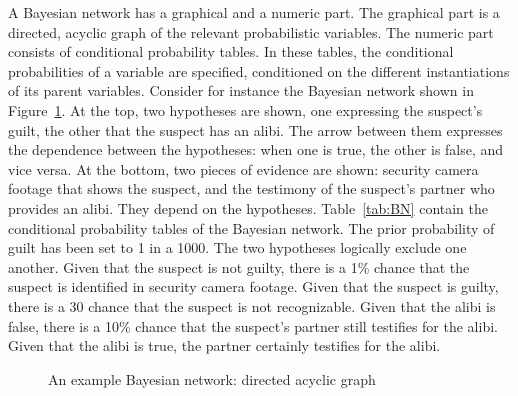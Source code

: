 \documentclass[10pt]{article}
\begin{document}
A Bayesian network has a graphical and a numeric part. The graphical part is a directed, acyclic graph of the relevant probabilistic variables. The numeric part consists of conditional probability tables. In these tables, the conditional probabilities of a variable are specified, conditioned on the different instantiations of its parent variables. Consider for instance the Bayesian network shown in Figure~\ref{fig:BN}. At the top, two hypotheses are shown, one expressing the suspect's guilt, the other that the suspect has an alibi. The arrow between them expresses the dependence between the hypotheses: when one is true, the other is false, and vice versa. At the bottom, two pieces of evidence are shown: security camera footage that shows the suspect, and the testimony of the suspect's partner who provides an alibi. They depend on the hypotheses. Table~\ref{tab:BN} contain the conditional probability tables of the Bayesian network. The prior probability of guilt has been set to 1 in a 1000. The two hypotheses logically exclude one another. Given that the suspect is not guilty, there is a 1\% chance that the suspect is identified in security camera footage. Given that the suspect is guilty, there is a 30\5 chance that the suspect is not recognizable. Given that the alibi is false, there is a 10\% chance that the suspect's partner still testifies for the alibi. Given that the alibi is true, the partner certainly testifies for the alibi.

\begin{figure}[t]
\centering

\caption{An example Bayesian network: directed acyclic graph\label{fig:BN}}
\end{figure}
\end{document}
